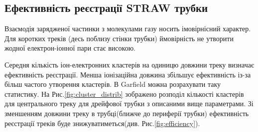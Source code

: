 \documentclass[pdftex,14pt]{scrartcl}
\begin{document}
	\subsection{Ефективність реєстрації STRAW трубки}
	
	Взаємодія зарядженої частинки з молекулами газу носить імовірнісний характер. Для коротких треків (десь поблизу стінки трубки) ймовірність не утворити жодної електрон-іонної пари стає високою.
	
	Середня кількість іон-електронних кластерів на одиницю довжини треку визначає ефективність реєстрації. \cite{kozlinskiy} Менша іонізаційна довжина збільшує ефективність із-за більш частого утворення кластерів. В Garfield можна розрахувати  таку статистику. На Рис.\ref{fig:cluster_distrib}  зображено розподіл кількості кластерів для центрального треку для дрейфової трубки з описаними вище параметрами. Зі зменшенням довжини треку в трубці(ближче до периферії трубки) ефективність реєстрації треків буде знижуватиметься(див. Рис.\ref{fig:efficiency}).
	
	
		
\end{document}
